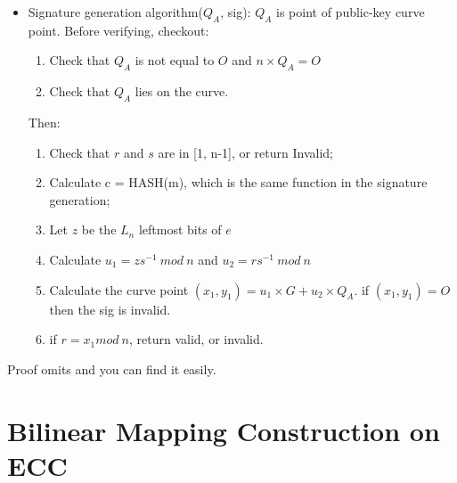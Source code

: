 \documentclass[a4paper,11pt]{article}
\begin{document}
\begin{itemize}
\item Signature generation algorithm($Q_A$, sig):  $Q_A$ is point of public-key curve point.
Before verifying, checkout: 
\begin{enumerate}
\item Check that $Q_A$ is not equal to $O$ and $n \times Q_A = O$
\item Check that $Q_A$ lies on the curve.
\end{enumerate}

Then:
\begin{enumerate}
\item Check that $r$ and $s$ are in [1, n-1], or return Invalid;
\item Calculate c = HASH(m), which is the same function in the signature generation;
\item Let $z$ be the $L_n$ leftmost bits of $e$
\item Calculate $u_1 = zs^{-1}\ mod\ n$  and $u_2 = rs^{-1}\ mod\ n$
\item Calculate the curve point $(x_1, y_1) =  u_1 \times G + u_2 \times Q_A$. if $(x_1, y_1) = O$ then the sig is invalid.
\item if $ r = x_1 mod\ n$, return valid, or invalid.
\end{enumerate}

\end{itemize}
Proof omits and you can find it easily. 



\section{Bilinear Mapping Construction on ECC}



\end{document}
